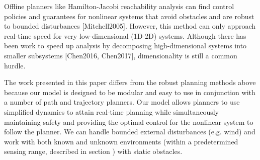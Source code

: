 Offline planners like Hamilton-Jacobi reachability analysis can find control policies and guarantees for nonlinear systems that avoid obstacles and are robust to bounded disturbances [Mitchell2005].  However, this method can only approach real-time speed for very low-dimensional (1D-2D) systems. Although there has been work to speed up analysis by decomposing high-dimensional systems into smaller subsystems [Chen2016, Chen2017], dimensionality is still a common hurdle.


The work presented in this paper differs from the robust planning methods above because our model is designed to be modular and easy to use in conjunction with a number of path and trajectory planners.  Our model allows planners to use simplified dynamics to attain real-time planning while simultaneously maintaining safety and providing the optimal control for the nonlinear system to follow the planner. We can handle bounded external disturbances (e.g. wind) and work with both known and unknown environments (within a predetermined sensing range, described in section ) with static obstacles. 

